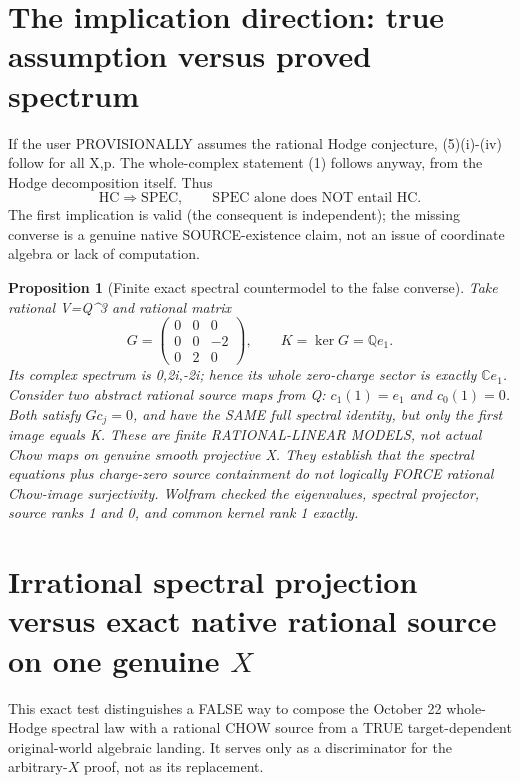 \documentclass[11pt]{article}
\newtheorem{proposition}[theorem]{Proposition}
\newcommand{\QQ}{\mathbb Q}
\newcommand{\CC}{\mathbb C}
\begin{document}
\section{The implication direction: true assumption versus proved spectrum}
If the user PROVISIONALLY assumes the rational Hodge
conjecture, (5)(i)-(iv) follow for all X,p.
The whole-complex statement (1) follows anyway,
from the Hodge decomposition itself. Thus
\[
 \boxed{\mathrm{HC}\Rightarrow\mathrm{SPEC},\qquad
 \mathrm{SPEC}\text{ alone does NOT entail }\mathrm{HC}.} \tag{7}
\]
The first implication is valid (the consequent is independent);
the missing converse is a genuine native SOURCE-existence claim,
not an issue of coordinate algebra or lack of computation.

\begin{proposition}[Finite exact spectral countermodel to the false converse]
Take rational V=Q^3 and rational matrix
\[
 G=\begin{pmatrix}
 0&0&0\\0&0&-2\\0&2&0
 \end{pmatrix},\qquad
 K=\ker G=\QQ e_1.
\]
Its complex spectrum is 0,2i,-2i; hence its whole
zero-charge sector is exactly \(\CC e_1\).
Consider two abstract rational source maps from Q:
\(c_1(1)=e_1\) and \(c_0(1)=0\).
Both satisfy \(Gc_j=0\), and have the SAME full
spectral identity, but only the first image equals K.
These are finite RATIONAL-LINEAR MODELS, not actual
Chow maps on genuine smooth projective X.
They establish that the spectral equations plus
charge-zero source containment do not logically FORCE
rational Chow-image surjectivity.
Wolfram checked the eigenvalues, spectral projector,
source ranks 1 and 0, and common kernel rank 1 exactly.
\end{proposition}


\section{Irrational spectral projection versus exact native rational source on one genuine $X$}
This exact test distinguishes a FALSE way to compose the October 22
whole-Hodge spectral law with a rational CHOW source from a TRUE
target-dependent original-world algebraic landing.
It serves only as a discriminator for the arbitrary-$X$ proof,
not as its replacement.
\end{document}
